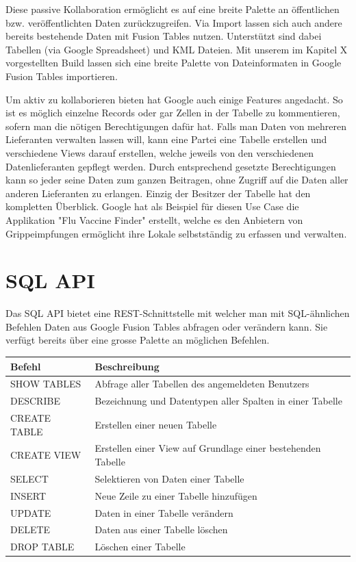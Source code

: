 Diese passive Kollaboration ermöglicht es auf eine breite Palette an öffentlichen bzw. veröffentlichten Daten zurückzugreifen. Via Import lassen sich auch andere bereits bestehende Daten mit Fusion Tables nutzen. Unterstützt sind dabei Tabellen (via Google Spreadsheet) und KML Dateien. Mit unserem im Kapitel X  vorgestellten Build lassen sich eine breite Palette von Dateinformaten in Google Fusion Tables importieren.

Um aktiv zu kollaborieren bieten hat Google auch einige Features angedacht. So ist es möglich einzelne Records oder gar Zellen in der Tabelle zu kommentieren, sofern man die nötigen Berechtigungen dafür hat. Falls man Daten von mehreren Lieferanten verwalten lassen will, kann eine Partei eine Tabelle erstellen und verschiedene Views darauf erstellen, welche jeweils von den verschiedenen Datenlieferanten gepflegt werden. Durch entsprechend gesetzte Berechtigungen kann so jeder seine Daten zum ganzen Beitragen, ohne Zugriff auf die Daten aller anderen Lieferanten zu erlangen. Einzig der Besitzer der Tabelle hat den kompletten Überblick. Google hat als Beispiel für diesen Use Case die Applikation "Flu Vaccine Finder" erstellt, welche es den Anbietern von Grippeimpfungen ermöglicht ihre Lokale selbstständig zu erfassen und verwalten.\cite{data-gathering}


\section{SQL API}
Das SQL API bietet eine REST-Schnittstelle mit welcher man mit SQL-ähnlichen Befehlen Daten aus Google Fusion Tables abfragen oder verändern kann. Sie verfügt bereits über eine grosse Palette an möglichen Befehlen.

\begin{tabular}{|l|l|}
\hline 
Befehl & Beschreibung \\ 
\hline 
SHOW TABLES & Abfrage aller Tabellen des angemeldeten Benutzers \\ 
\hline 
DESCRIBE & Bezeichnung und Datentypen aller Spalten in einer Tabelle \\ 
\hline 
CREATE TABLE & Erstellen einer neuen Tabelle \\ 
\hline 
CREATE VIEW & Erstellen einer View auf Grundlage einer bestehenden Tabelle \\ 
\hline 
SELECT & Selektieren von Daten einer Tabelle \\ 
\hline 
INSERT & Neue Zeile zu einer Tabelle hinzufügen \\ 
\hline 
UPDATE & Daten in einer Tabelle verändern \\ 
\hline 
DELETE & Daten aus einer Tabelle löschen \\ 
\hline 
DROP TABLE & Löschen einer Tabelle \\ 
\hline 
\end{tabular}

